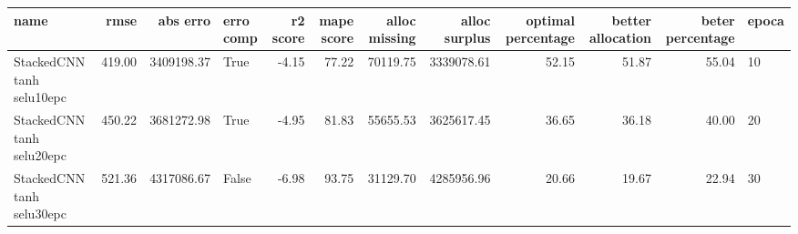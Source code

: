 \begin{tabular}{lrrlrrrrrrrl}
\toprule
name & rmse & abs erro & erro comp & r2 score & mape score & alloc missing & alloc surplus & optimal percentage & better allocation & beter percentage & epoca \\
\midrule
StackedCNN tanh selu10epc & 419.00 & 3409198.37 & True & -4.15 & 77.22 & 70119.75 & 3339078.61 & 52.15 & 51.87 & 55.04 & 10 \\
StackedCNN tanh selu20epc & 450.22 & 3681272.98 & True & -4.95 & 81.83 & 55655.53 & 3625617.45 & 36.65 & 36.18 & 40.00 & 20 \\
StackedCNN tanh selu30epc & 521.36 & 4317086.67 & False & -6.98 & 93.75 & 31129.70 & 4285956.96 & 20.66 & 19.67 & 22.94 & 30 \\
\bottomrule
\end{tabular}
